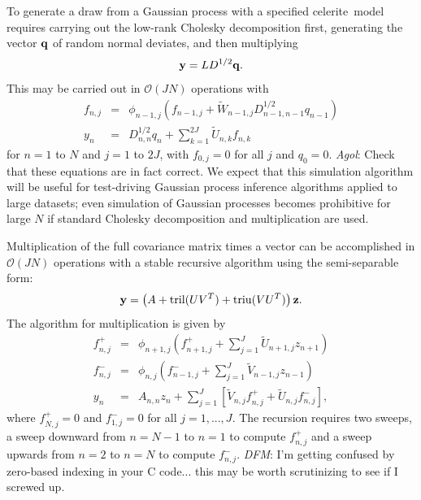 \documentclass[manuscript, letterpaper]{aastex6}
\makeatletter
\let\origsubsection\subsection
\renewcommand\subsection{\@ifstar{\starsubsection}{\nostarsubsection}}
\newcommand\nostarsubsection[1]{\subsectionprelude\origsubsection{#1}}
\newcommand\starsubsection[1]{\subsectionprelude\origsubsection*{#1}}
\newcommand\subsectionprelude{\vspace{1em}}
\newcommand{\project}[1]{\textsf{#1}}
\newcommand{\celerite}{\project{celerite}}
\newcommand{\todo}[3]{{\color{#2}\emph{#1}: #3}}
\newcommand{\dfmtodo}[1]{\todo{DFM}{red}{#1}}
\newcommand{\agoltodo}[1]{\todo{Agol}{blue}{#1}}
\makeatother
\begin{document}
To generate a draw from a Gaussian process with a specified \celerite\ model requires carrying out the
low-rank Cholesky decomposition first, generating the vector ${\bf q}$ of random normal deviates, and then multiplying
\begin{equation}
{\bf y} = L D^{1/2} {\bf q}.
\end{equation}
This may be carried out in $\mathcal{O}(JN)$ operations with
\begin{eqnarray}
f_{n,j} &=& \phi_{n-1,j} \left(f_{n-1,j} + \tilde{W}_{n-1,j} D_{n-1,n-1}^{1/2} q_{n-1}\right)\\
y_n &=& D_{n,n}^{1/2} q_n + \sum_{k=1}^{2J} \tilde{U}_{n,k} f_{n,k}
\end{eqnarray}
for $n = 1$ to $N$ and $j=1$ to $2J$, with $f_{0,j} = 0$ for all $j$ and $q_0 = 0$.
\agoltodo{Check that these equations are in fact correct.}
We expect that this simulation algorithm will be useful for test-driving Gaussian
process inference algorithms applied to large datasets; even simulation of
Gaussian processes becomes prohibitive for large $N$ if standard Cholesky decomposition
and multiplication are used.

\subsection{Multiplication and filtering}

Multiplication of the full covariance matrix times a vector can be accomplished in $\mathcal{O}(JN)$
operations with a stable recursive algorithm using the semi-separable form:
\begin{equation}
{\bf y} =  \left(A + \mathrm{tril}(U V^T) + \mathrm{triu}(V U^T)\right) {\bf z}.
\end{equation}
The algorithm for multiplication is given by
\begin{eqnarray}
f^+_{n,j} &=& \phi_{n+1,j} \left(f^+_{n+1,j} + \sum_{j=1}^J \tilde U_{n+1,j} z_{n+1}\right)\\
f^-_{n,j} &=& \phi_{n,j} \left(f^-_{n-1,j} + \sum_{j=1}^J \tilde V_{n-1,j} z_{n-1}\right)\\
y_n &=& A_{n,n} z_n + \sum_{j=1}^J \left[ \tilde V_{n,j} f^+_{n,j} + \tilde U_{n,j} f^-_{n,j}\right],
\end{eqnarray}
where $f^+_{N,j} = 0$ and $f^-_{1,j} = 0$ for all $j=1,...,J$.  The recursion requires
two sweeps, a sweep downward from $n=N-1$ to $n=1$ to compute $f^+_{n,j}$ and a sweep upwards
from $n=2$ to $n=N$ to compute $f^-_{n,j}$.  \dfmtodo{I'm getting confused by zero-based
indexing in your C code...  this may be worth scrutinizing to see if I screwed up.}
\end{document}
